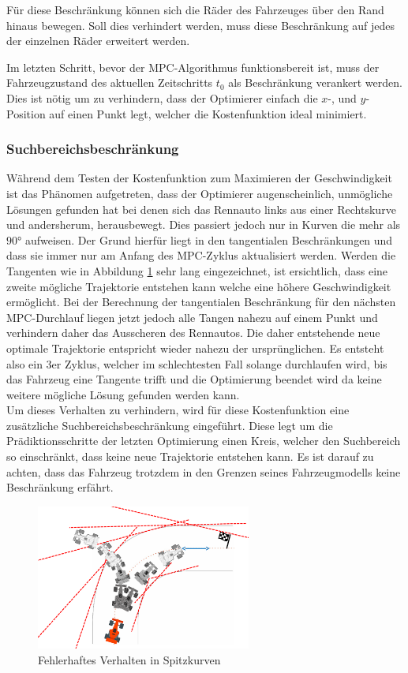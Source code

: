 \documentclass{like}
\begin{document}
Für diese Beschränkung können sich die Räder des Fahrzeuges über den Rand hinaus bewegen. Soll dies verhindert werden, muss diese Beschränkung auf jedes der einzelnen Räder erweitert werden.

Im letzten Schritt, bevor der \ac{MPC}-Algorithmus funktionsbereit ist, muss der Fahrzeugzustand des aktuellen Zeitschritts $t_0$ als Beschränkung verankert werden.  Dies ist nötig um zu verhindern, dass der Optimierer einfach die \(x\)-, und \(y\)-Position auf einen Punkt legt, welcher die Kostenfunktion ideal minimiert. 

\subsubsection*{Suchbereichsbeschränkung}
Während dem Testen der Kostenfunktion zum Maximieren der Geschwindigkeit ist das Phänomen aufgetreten, dass der Optimierer augenscheinlich, unmögliche Lösungen gefunden hat bei denen sich das Rennauto links aus einer Rechtskurve und andersherum, herausbewegt. Dies passiert jedoch nur in Kurven die mehr als $90°$ aufweisen. Der Grund hierfür liegt in den tangentialen Beschränkungen und dass sie immer nur am Anfang des MPC-Zyklus aktualisiert werden. Werden die Tangenten wie in Abbildung \ref{fig:curveAnomaly} sehr lang eingezeichnet, ist ersichtlich, dass eine zweite mögliche Trajektorie entstehen kann welche eine höhere Geschwindigkeit ermöglicht. Bei der Berechnung der tangentialen Beschränkung für den nächsten MPC-Durchlauf liegen jetzt jedoch alle Tangen nahezu auf einem Punkt und verhindern daher das Ausscheren des Rennautos. Die daher entstehende neue optimale Trajektorie entspricht wieder nahezu der ursprünglichen. Es entsteht also ein 3er Zyklus, welcher im schlechtesten Fall solange durchlaufen wird, bis das Fahrzeug eine Tangente trifft und die Optimierung beendet wird da keine weitere mögliche Lösung gefunden werden kann.\\
Um dieses Verhalten zu verhindern, wird für diese Kostenfunktion eine zusätzliche Suchbereichsbeschränkung eingeführt. Diese legt um die Prädiktionsschritte der letzten Optimierung einen Kreis, welcher den Suchbereich so einschränkt, dass keine neue Trajektorie entstehen kann. Es ist darauf zu achten, dass das Fahrzeug trotzdem in den Grenzen seines Fahrzeugmodells keine Beschränkung erfährt. 


\begin{figure}[ht!]
	\centering
	\includegraphics[width=200pt]{Abbildungen/curveAnomaly.png}
	\caption{Fehlerhaftes Verhalten in Spitzkurven}
	\label{fig:curveAnomaly}
\end{figure}
\end{document}
